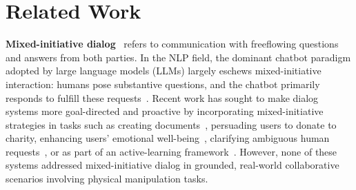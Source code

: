 \section{Related Work}

\label{sec:related-work}

\textbf{Mixed-initiative dialog}~\cite{4081977, 796083, chu-carroll-2000-mimic} refers to communication with freeflowing questions and answers from both parties. In the NLP field, the dominant chatbot paradigm adopted by large language models (LLMs) largely eschews mixed-initiative interaction: humans pose substantive questions, and the chatbot primarily responds to fulfill these requests~\cite{ouyang2022training, achiam2023gpt}. 
Recent work has sought to make dialog systems more goal-directed and proactive by incorporating mixed-initiative strategies in tasks such as creating documents~\cite{collabllm2025}, persuading users to donate to charity, enhancing users’ emotional well-being~\cite{deng2023survey, yu2023promptbasedmontecarlotreesearch, chen2023controllable, deng2024plugandplaypolicyplannerlarge}, clarifying ambiguous human requests~\cite{qian2021databasesearchresultsdisambiguation, deng2023promptingevaluatinglargelanguage, chen2024learningclarifymultiturnconversations}, or as part of an active-learning framework~\cite{Thomason2019ImprovingGN}. 
However, none of these systems addressed mixed-initiative dialog in grounded, real-world collaborative scenarios involving physical manipulation tasks.



